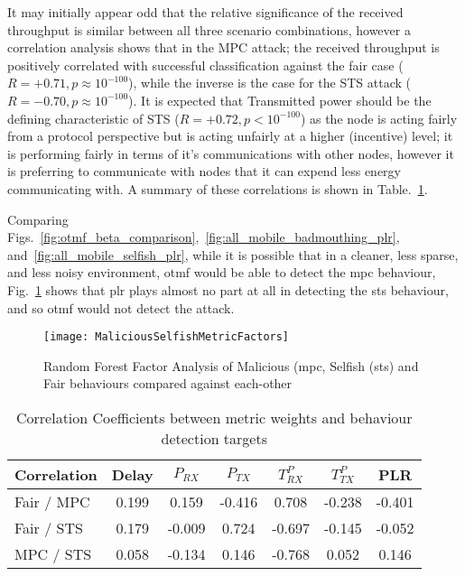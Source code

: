 It may initially appear odd that the relative significance of the received throughput is similar between all three scenario combinations, however a correlation analysis shows that in the MPC attack; the received throughput is positively correlated with successful classification against the fair case ($R=+0.71, p\approx10^{-100}$), while the inverse is the case for the STS attack ($R=-0.70, p\approx10^{-100}$).
It is expected that Transmitted power should be the defining characteristic of STS ($R=+0.72, p<10^{-100}$) as the node is acting fairly from a protocol perspective but is acting unfairly at a higher (incentive) level; it is performing fairly in terms of it's communications with other nodes, however it is preferring to communicate with nodes that it can expend less energy communicating with.
A summary of these correlations is shown in Table.~\ref{tab:correlations}.

Comparing Figs.~\ref{fig:otmf_beta_comparison},~\ref{fig:all_mobile_badmouthing_plr}, and~\ref{fig:all_mobile_selfish_plr}, while it is possible that in a cleaner, less sparse, and less noisy environment, \gls{otmf} would be able to detect the \gls{mpc} behaviour, Fig.~\ref{fig:malselfactors} shows that \gls{plr} plays almost no part at all in detecting the \gls{sts} behaviour, and so \gls{otmf} would not detect the attack.

\begin{figure}
	\centering
	\texttt{[image: MaliciousSelfishMetricFactors]}
	\caption{Random Forest Factor Analysis of Malicious (\gls{mpc}, Selfish (\gls{sts}) and Fair behaviours compared against each-other}
	\label{fig:malselfactors}
\end{figure}

\begin{table}[h]
	\caption{Correlation Coefficients between metric weights and behaviour detection targets} \label{tab:correlations}
	\begin{center}
		\begin{tabular}{lcccccc}
			\toprule
			Correlation      & Delay & $P_{RX}$ & $P_{TX}$ & $T^P_{RX}$ & $T^P_{TX}$ & PLR \\
			\midrule
			Fair / MPC       & 0.199 &  0.159   & -0.416  &  0.708   & -0.238   & -0.401\\
			Fair / STS       & 0.179 &  -0.009  &  0.724  & -0.697   & -0.145   & -0.052\\
			MPC / STS        & 0.058 &  -0.134  &  0.146  & -0.768   &  0.052   &  0.146\\
			\bottomrule
		\end{tabular}
	\end{center}
\end{table}


